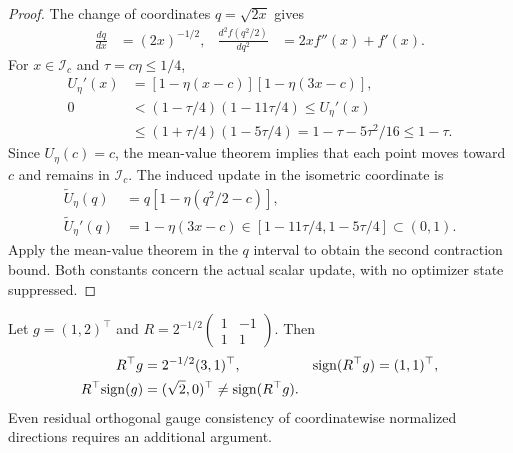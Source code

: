 \begin{proof}
The change of coordinates $q=\sqrt{2x}$ gives
\begin{align}
\frac{dq}{dx}&=(2x)^{-1/2},&
\frac{d^2f(q^2/2)}{dq^2}
&=2xf''(x)+f'(x).
\end{align}
For $x\in\mathcal I_c$ and $\tau=c\eta\leq1/4$,
\begin{align}
U_\eta'(x)
&=[1-\eta(x-c)][1-\eta(3x-c)],\\
0&<(1-\tau/4)(1-11\tau/4)
\leq U_\eta'(x)\\
&\leq(1+\tau/4)(1-5\tau/4)
=1-\tau-5\tau^2/16\leq1-\tau .
\end{align}
Since $U_\eta(c)=c$, the mean-value theorem implies that each point
moves toward $c$ and remains in $\mathcal I_c$.
The induced update in the isometric coordinate is
\begin{align}
\widetilde U_\eta(q)
&=q[1-\eta(q^2/2-c)],\\
\widetilde U_\eta'(q)
&=1-\eta(3x-c)
\in[1-11\tau/4,1-5\tau/4]\subset(0,1).
\end{align}
Apply the mean-value theorem in the $q$ interval to obtain the second
contraction bound. Both constants concern the actual scalar update,
with no optimizer state suppressed.
\end{proof}

\begin{proposition}
Let $g=(1,2)^\top$ and
$R=2^{-1/2}\begin{pmatrix}1&-1\\1&1\end{pmatrix}$. Then
\begin{align}
R^\top g&=2^{-1/2}(3,1)^\top,&
{\rm sign}(R^\top g)&=(1,1)^\top,\\
R^\top{\rm sign}(g)&=(\sqrt2,0)^\top
\ne {\rm sign}(R^\top g).
\end{align}
Even residual orthogonal gauge consistency of coordinatewise normalized
directions requires an additional argument.
\end{proposition}
